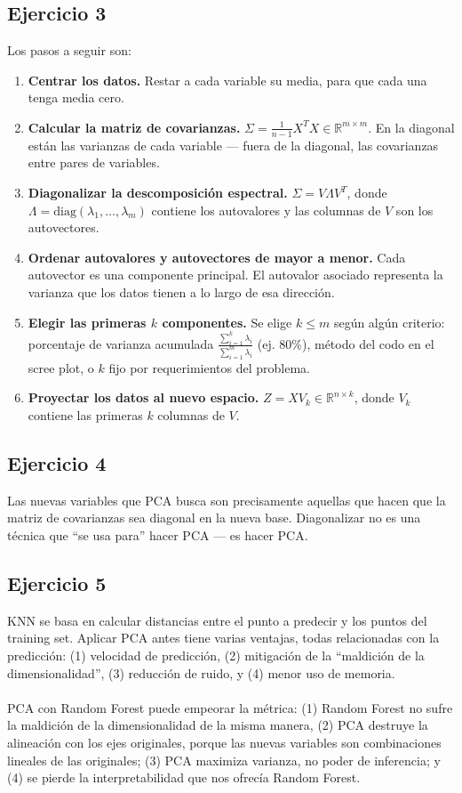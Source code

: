 \documentclass[a4paper,12pt]{article}
\begin{document}
\subsection*{Ejercicio 3}
\noindent Los pasos a seguir son:
\begin{enumerate}
	\item \textbf{Centrar los datos.} Restar a cada variable su media, para que cada una tenga media cero.
	\item \textbf{Calcular la matriz de covarianzas.} $\Sigma = \frac{1}{n-1} X^T X \in \mathbb{R}^{m \times m}$. En la diagonal están las varianzas de cada variable --- fuera de la diagonal, las covarianzas entre pares de variables.
	\item \textbf{Diagonalizar la descomposición espectral.} $\Sigma = V \Lambda V^T$, donde $\Lambda = \mathrm{diag}(\lambda_1, \dots, \lambda_m)$ contiene los autovalores y las columnas de $V$ son los autovectores.
	\item \textbf{Ordenar autovalores y autovectores de mayor a menor.} Cada autovector es una componente principal. El autovalor asociado representa la varianza que los datos tienen a lo largo de esa dirección.
	\item \textbf{Elegir las primeras $k$ componentes.} Se elige $k \leq m$ según algún criterio: porcentaje de varianza acumulada $\frac{\sum_{i=1}^{k}\lambda_i}{\sum_{i=1}^{m}\lambda_i}$ (ej. 80\%), método del codo en el scree plot, o $k$ fijo por requerimientos del problema.
	\item \textbf{Proyectar los datos al nuevo espacio.} $Z = X V_k \in \mathbb{R}^{n \times k}$, donde $V_k$ contiene las primeras $k$ columnas de $V$.
\end{enumerate}
\subsection*{Ejercicio 4}
\noindent Las nuevas variables que PCA busca son precisamente aquellas que hacen que la matriz de covarianzas sea diagonal en la nueva base. Diagonalizar no es una técnica que ``se usa para'' hacer PCA --- es hacer PCA.
\subsection*{Ejercicio 5}
\noindent KNN se basa en calcular distancias entre el punto a predecir y los puntos del training set. Aplicar PCA antes tiene varias ventajas, todas relacionadas con la predicción: (1) velocidad de predicción, (2) mitigación de la ``maldición de la dimensionalidad'', (3) reducción de ruido, y (4) menor uso de memoria. \\
\\
\noindent PCA con Random Forest puede empeorar la métrica: (1) Random  Forest no sufre la maldición de la dimensionalidad de la misma manera, (2) PCA destruye la alineación con los ejes originales, porque las nuevas variables son combinaciones lineales de las originales; (3) PCA maximiza varianza, no poder de inferencia; y (4) se pierde la interpretabilidad que nos ofrecía Random Forest.
\end{document}

